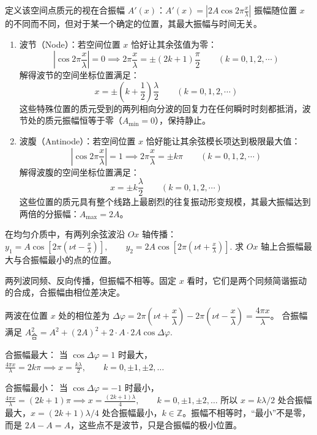 \documentclass[lang=cn,11pt]{elegantbook}
\begin{document}
\begin{definition}[波节，波腹]
定义该空间点质元的视在合振幅 $A'(x)$：$A'(x) = \left| 2A \cos 2\pi \frac{x}{\lambda} \right|$
振幅随位置 $x$ 的不同而不同，但对于某一个确定的位置，其最大振幅与时间无关。
\begin{enumerate}
\item 波节（Node）：若空间位置 $x$ 恰好让其余弦值为零：$$\left| \cos 2\pi \frac{x}{\lambda} \right| = 0 \implies 2\pi \frac{x}{\lambda} = \pm (2k + 1)\frac{\pi}{2} \qquad (k = 0,1,2,\cdots)$$解得波节的空间坐标位置满足：$$\boxed{x = \pm \left( k + \frac{1}{2} \right) \frac{\lambda}{2} \qquad (k = 0,1,2,\cdots)}$$这些特殊位置的质元受到的两列相向分波的回复力在任何瞬时时刻都抵消，波节处的质元振幅恒等于零（$A_{\text{min}} = 0$），保持静止。
\item 波腹（Antinode）：若空间位置 $x$ 恰好能让其余弦模长项达到极限最大值：$$\left| \cos 2\pi \frac{x}{\lambda} \right| = 1 \implies 2\pi \frac{x}{\lambda} = \pm k\pi \qquad (k = 0,1,2,\cdots)$$解得波腹的空间坐标位置满足：$$\boxed{x = \pm k \frac{\lambda}{2} \qquad (k = 0,1,2,\cdots)}$$这些位置的质元具有整个线路上最剧烈的往复振动形变规模，其最大振幅达到两倍的分振幅：$A_{\text{max}} = 2A$。
\end{enumerate}
\end{definition}

\begin{exercise}
在均匀介质中，有两列余弦波沿 \(Ox\) 轴传播：
 \(y_1=A\cos\left[2\pi\left(\nu t-\frac{x}{\lambda}\right)\right], \qquad y_2=2A\cos\left[2\pi\left(\nu t+\frac{x}{\lambda}\right)\right].\) 
求 \(Ox\) 轴上合振幅最大与合振幅最小的点的位置。
\end{exercise}

\begin{solution}
两列波同频、反向传播，但振幅不相等。固定 \(x\) 看时，它们是两个同频简谐振动的合成，合振幅由相位差决定。

两波在位置 \(x\) 处的相位差为 \(\Delta\varphi=2\pi\left(\nu t+\dfrac{x}{\lambda}\right)-2\pi\left(\nu t-\dfrac{x}{\lambda}\right)=\dfrac{4\pi x}{\lambda}\)。
合振幅满足
 \(A_{\text{合}}^2=A^2+(2A)^2+2\cdot A\cdot2A\cos\Delta\varphi.\) 

合振幅最大： 当 \(\cos\Delta\varphi=1\) 时最大，
 \(\frac{4\pi x}{\lambda}=2k\pi \implies x=\frac{k\lambda}{2}, \qquad k=0,\pm1,\pm2,\dots\) 

合振幅最小： 当 \(\cos\Delta\varphi=-1\) 时最小，
 \(\frac{4\pi x}{\lambda}=(2k+1)\pi \implies x=\frac{(2k+1)\lambda}{4}, \qquad k=0,\pm1,\pm2,\dots\) 
所以 \(x=k\lambda/2\) 处合振幅最大，\(x=(2k+1)\lambda/4\) 处合振幅最小，\(k\in\mathbb{Z}\)。振幅不相等时，“最小”不是零，而是 \(2A-A=A\)，这些点不是波节，只是合振幅的极小位置。
\end{solution}
\end{document}
